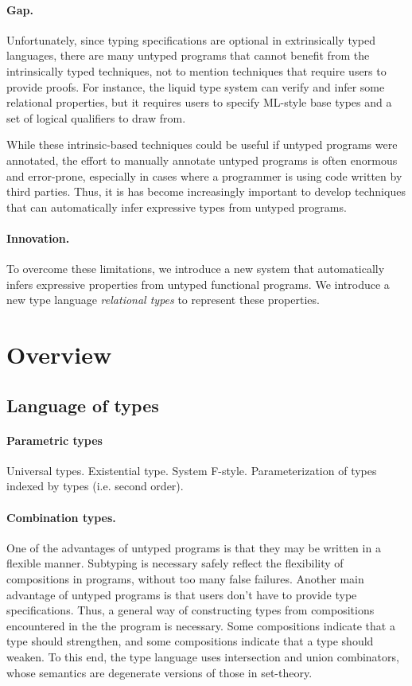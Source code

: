 \documentclass[acmsmall]{acmart}
\begin{document}
\paragraph{Gap.} 
Unfortunately, since typing specifications are optional in extrinsically typed languages,
there are many untyped programs that cannot benefit from the intrinsically typed techniques,
not to mention techniques that require users to provide proofs.
For instance, the liquid type system \cite{} can verify and infer some relational properties, 
but it requires users to specify ML-style base types and a set of logical qualifiers to draw from.

While these intrinsic-based techniques could be useful if untyped programs were annotated,
the effort to manually annotate untyped programs is often enormous and error-prone, 
especially in cases where a programmer is using code written by third parties.
Thus, it is has become increasingly important to develop techniques 
that can automatically infer expressive types from untyped programs.

\paragraph{Innovation.} 
To overcome these limitations, we introduce a new system 
that automatically infers expressive properties from untyped functional programs. 
We introduce a new type language \textit{relational types} to represent these properties.

\section{Overview}

\subsection{Language of types}

\paragraph{Parametric types}
Universal types. Existential type. System F-style. Parameterization of types indexed by types (i.e. second order).

\paragraph{Combination types.}
One of the advantages of untyped programs is that they may be written in a flexible manner.
Subtyping is necessary safely reflect the flexibility of compositions in programs, without too many false failures.
Another main advantage of untyped programs is that users don't have to provide type specifications.
Thus, a general way of constructing types from compositions encountered in the the program is necessary.
Some compositions indicate that a type should strengthen, and some compositions indicate that a type should weaken.
To this end, the type language uses intersection and union combinators, 
whose semantics are degenerate versions of those in set-theory.
\end{document}
